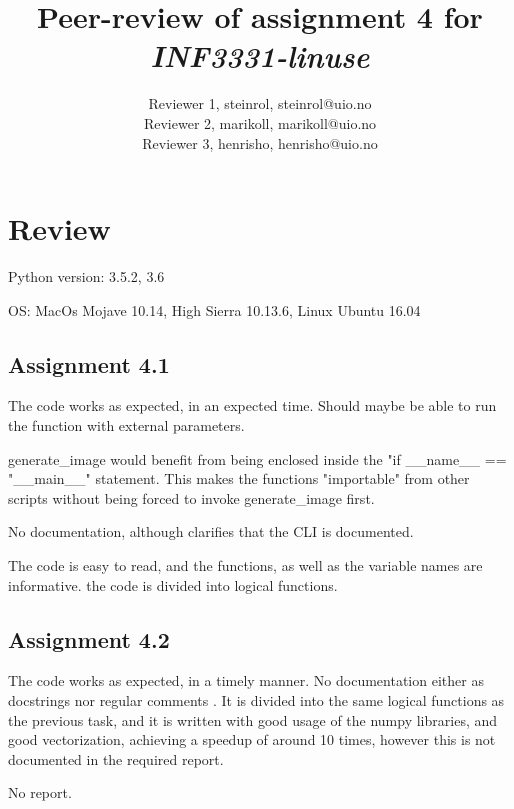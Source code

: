 \documentclass[a4paper]{article}
\title{Peer-review of assignment 4 for \textit{INF3331-linuse}}
\author{Reviewer 1, steinrol, {steinrol@uio.no} \\
 		Reviewer 2, marikoll, {marikoll@uio.no} \\
		Reviewer 3, henrisho, {henrisho@uio.no}}
\begin{document}
\maketitle



\section{Review }\label{sec:review}



Python version: 3.5.2, 3.6

OS: MacOs Mojave 10.14, High Sierra 10.13.6, Linux Ubuntu 16.04
\subsection*{Assignment 4.1}


The code works as expected, in an expected time. Should maybe be able to run the function with external parameters.

\medskip

generate\_image would benefit from being enclosed inside the "if \_\_name\_\_ == "\_\_main\_\_" statement. This makes the functions "importable" from other scripts without being forced to invoke generate\_image first.

\medskip

No documentation, although clarifies that the CLI is documented.

\medskip

The code is easy to read, and the functions, as well as the variable names are informative. the code is divided into logical functions.


\subsection*{Assignment 4.2} \label{sec:assignment5.2}


The code works as expected, in a timely manner. No documentation either as docstrings nor regular comments . It is divided into the same logical functions as the previous task, and it is written with good usage of the numpy libraries, and good vectorization, achieving a speedup of around 10 times, however this is not documented in the required report.

\medskip
No report.
\end{document}
